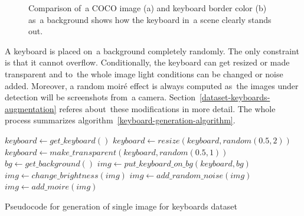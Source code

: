 \vspace{-4pt}
\begin{figure}[tbh]
    \centering
    \qquad
    \vspace{-4pt}
    \caption{Comparison of~a COCO image (a) and keyboard border color (b) as~a background shows how the keyboard in~a scene clearly stands out.}
    \label{keyboard-bg-comparison}
\end{figure}

A keyboard is placed on~a background completely randomly. The only constraint is that it cannot overflow. Conditionally, the keyboard can get resized or made transparent and to~the whole image light conditions can be changed or noise added. Moreover, a random moiré effect is always computed as~the images under detection will be screenshots from~a camera. Section~\ref{dataset-keyboards-augmentation} referes about~these modifications in more detail. The whole process summarizes algorithm~\ref{keyboard-generation-algorithm}.

\begin{algorithm}
    \begin{algorithmic}[1]
    \STATE $keyboard\gets get\_keyboard()$
        \STATE $keyboard\gets resize(keyboard, random(0.5, 2))$
    \ENDIF
        \STATE $keyboard\gets make\_transparent(keyboard, random(0.5, 1))$
    \ENDIF
    \STATE $bg\gets get\_background()$
    \STATE $img\gets put\_keyboard\_on\_bg(keyboard, bg)$
        \STATE $img\gets change\_brightness(img)$
    \ENDIF
        \STATE $img\gets add\_random\_noise(img)$
    \ENDIF
    \STATE $img\gets add\_moire(img)$
    \end{algorithmic}
    \caption{Pseudocode for generation of single image for keyboards dataset}
    \label{keyboard-generation-algorithm}
\end{algorithm}

